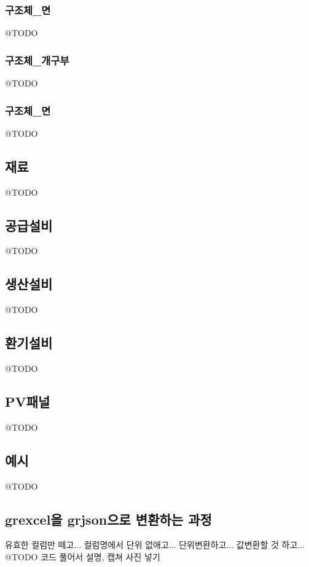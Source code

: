 \subsubsection{구조체\_면}
@TODO

\subsubsection{구조체\_개구부}
@TODO

\subsubsection{구조체\_면}
@TODO

\subsection{재료}
@TODO

\subsection{공급설비}
@TODO

\subsection{생산설비}
@TODO

\subsection{환기설비}
@TODO

\subsection{PV패널}
@TODO

\subsection{예시}
@TODO


\subsection{grexcel을 grjson으로 변환하는 과정}
유효한 컬럼만 떼고...
컬럼명에서 단위 없애고...
단위변환하고...
값변환할 것 하고...
@TODO  코드 풀어서 설명, 캡쳐 사진 넣기



